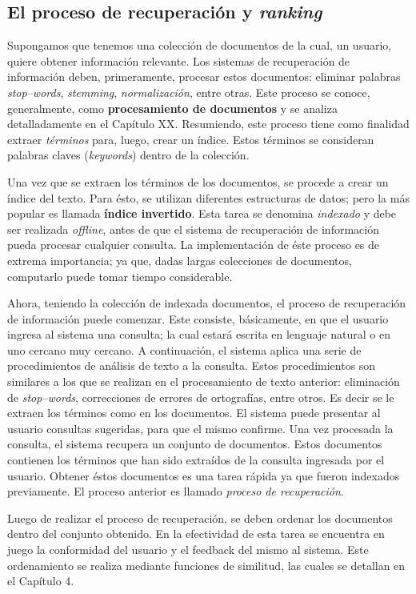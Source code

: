	\subsection{El proceso de recuperación y \textit{ranking}}
		Supongamos que tenemos una colección de documentos de la cual, un usuario, quiere obtener información relevante. Los sistemas de recuperación de información deben, primeramente, procesar estos documentos: eliminar palabras \textit{stop--words}, \textit{stemming}, \textit{normalización}, entre otras. Este proceso se conoce, generalmente, como \textbf{procesamiento de documentos} y se analiza detalladamente en el Capítulo XX. Resumiendo, este proceso tiene como finalidad extraer \textit{términos} para, luego, crear un índice. Estos términos se consideran palabras claves (\textit{keywords}) dentro de la colección. \par

		Una vez que se extraen los términos de los documentos, se procede a crear un índice del texto. Para ésto, se utilizan diferentes estructuras de datos; pero la más popular es llamada \textbf{índice invertido}. Esta tarea se denomina \textit{indexado} y debe ser realizada \textit{offline}, antes de que el sistema de recuperación de información pueda procesar cualquier consulta. La implementación de éste proceso es de extrema importancia; ya que, dadas largas colecciones de documentos, computarlo puede tomar tiempo considerable. \par

		Ahora, teniendo la colección de indexada documentos, el proceso de recuperación de información puede comenzar. Este consiste, básicamente, en que el usuario ingresa al sistema una consulta; la cual estará escrita en lenguaje natural o en uno cercano muy cercano. A continuación, el sistema aplica una serie de procedimientos de análisis de texto a la consulta. Estos procedimientos son similares a los que se realizan en el procesamiento de texto anterior: eliminación de \textit{stop--words}, correcciones de errores de ortografías, entre otros. Es decir se le extraen los términos como en los documentos. El sistema puede presentar al usuario consultas sugeridas, para que el mismo confirme. Una vez procesada la consulta, el sistema recupera un conjunto de documentos. Estos documentos contienen los términos que han sido extraídos de la consulta ingresada por el usuario. Obtener éstos documentos es una tarea rápida ya que fueron indexados previamente. El proceso anterior es llamado \textit{proceso de recuperación}. \par

		Luego de realizar el proceso de recuperación, se deben ordenar los documentos dentro del conjunto obtenido. En la efectividad de esta tarea se encuentra en juego la conformidad del usuario y el feedback del mismo al sistema. Este ordenamiento se realiza mediante funciones de similitud, las cuales se detallan en el Capítulo 4.